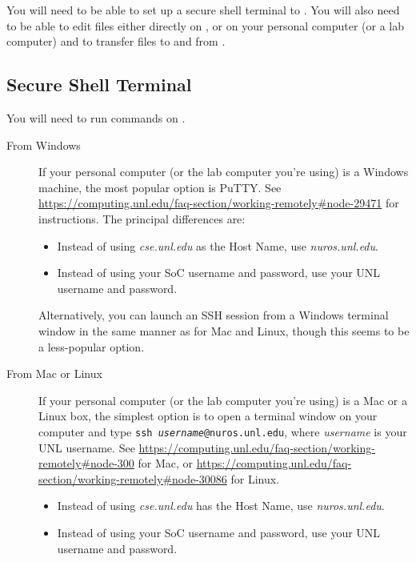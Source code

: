 

You will need to be able to set up a secure shell terminal to \runtimeenvironment.
You will also need to be able to edit files either directly on \runtimeenvironment, or on your personal computer (or a lab computer) and to transfer files to and from \runtimeenvironment.

\subsection{Secure Shell Terminal}

You will need to run commands on \runtimeenvironment.

\begin{description}
    \item[From Windows] If your personal computer (or the lab computer you're using) is a Windows machine, the most popular option is PuTTY\@.
        See \url{https://computing.unl.edu/faq-section/working-remotely#node-29471} for instructions.
        The principal differences are:
        \begin{itemize}
            \item Instead of using \textit{cse.unl.edu} as the Host Name, use \textit{nuros.unl.edu}.
            \item Instead of using your SoC username and password, use your UNL username and password.
        \end{itemize}
        Alternatively, you can launch an SSH session from a Windows terminal window in the same manner as for Mac and Linux, though this seems to be a less-popular option.
    \item[From Mac or Linux] If your personal computer (or the lab computer you're using) is a Mac or a Linux box, the simplest option is to open a terminal window on your computer and type \texttt{ssh \textit{username}@nuros.unl.edu}, where \textit{username} is your UNL username.
        See \url{https://computing.unl.edu/faq-section/working-remotely#node-300} for Mac, or \url{https://computing.unl.edu/faq-section/working-remotely#node-30086} for Linux.
        \begin{itemize}
            \item Instead of using \textit{cse.unl.edu} has the Host Name, use \textit{nuros.unl.edu}.
            \item Instead of using your SoC username and password, use your UNL username and password.
        \end{itemize}
\end{description}


